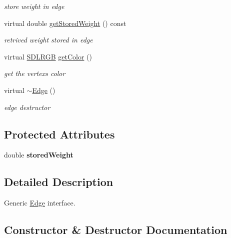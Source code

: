 \begin{DoxyCompactItemize}
\begin{DoxyCompactList}\small\item\em store weight in edge \end{DoxyCompactList}\item 
virtual double \hyperlink{class_edge_a1ea100fde60c88afd5eb6f5b7829b796}{get\+Stored\+Weight} () const 
\begin{DoxyCompactList}\small\item\em retrived weight stored in edge \end{DoxyCompactList}\item 
virtual \hyperlink{class_s_d_l_r_g_b}{S\+D\+L\+R\+G\+B} \hyperlink{class_edge_a16081643290e304fd50a39144a716e2d}{get\+Color} ()
\begin{DoxyCompactList}\small\item\em get the vertex\textquotesingle{}s color \end{DoxyCompactList}\item 
\hypertarget{class_edge_a2f37b72f044427961d6730943daf10e0}{}virtual \hyperlink{class_edge_a2f37b72f044427961d6730943daf10e0}{$\sim$\+Edge} ()\label{class_edge_a2f37b72f044427961d6730943daf10e0}

\begin{DoxyCompactList}\small\item\em edge destructor \end{DoxyCompactList}\end{DoxyCompactItemize}
\subsection*{Protected Attributes}
\begin{DoxyCompactItemize}
\item 
\hypertarget{class_edge_a94f44a5a7b1110641414bc2e00a4ba2f}{}double {\bfseries stored\+Weight}\label{class_edge_a94f44a5a7b1110641414bc2e00a4ba2f}

\end{DoxyCompactItemize}


\subsection{Detailed Description}
Generic \hyperlink{class_edge}{Edge} interface. 

\subsection{Constructor \& Destructor Documentation}
\hypertarget{class_edge_a175c30ff76609608a96c498c13ef55b0}{}
